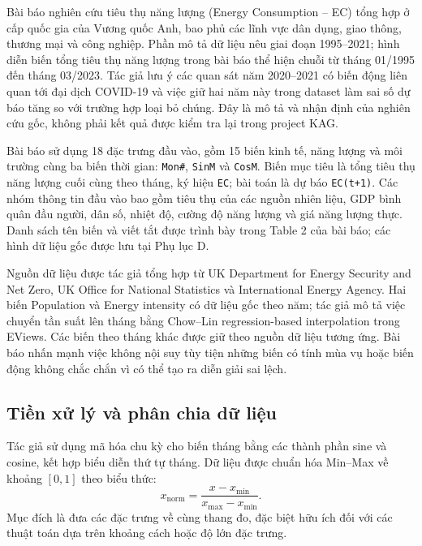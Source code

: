 Bài báo nghiên cứu tiêu thụ năng lượng (Energy Consumption -- EC) tổng hợp ở cấp quốc gia của Vương quốc Anh, bao phủ các lĩnh vực dân dụng, giao thông, thương mại và công nghiệp. Phần mô tả dữ liệu nêu giai đoạn 1995--2021; hình diễn biến tổng tiêu thụ năng lượng trong bài báo thể hiện chuỗi từ tháng 01/1995 đến tháng 03/2023. Tác giả lưu ý các quan sát năm 2020--2021 có biến động liên quan tới đại dịch COVID-19 và việc giữ hai năm này trong dataset làm sai số dự báo tăng so với trường hợp loại bỏ chúng. Đây là mô tả và nhận định của nghiên cứu gốc, không phải kết quả được kiểm tra lại trong project KAG.

Bài báo sử dụng 18 đặc trưng đầu vào, gồm 15 biến kinh tế, năng lượng và môi trường cùng ba biến thời gian: \texttt{Mon\#}, \texttt{SinM} và \texttt{CosM}. Biến mục tiêu là tổng tiêu thụ năng lượng cuối cùng theo tháng, ký hiệu \texttt{EC}; bài toán là dự báo \texttt{EC(t+1)}. Các nhóm thông tin đầu vào bao gồm tiêu thụ của các nguồn nhiên liệu, GDP bình quân đầu người, dân số, nhiệt độ, cường độ năng lượng và giá năng lượng thực. Danh sách tên biến và viết tắt được trình bày trong Table 2 của bài báo; các hình dữ liệu gốc được lưu tại Phụ lục D.

Nguồn dữ liệu được tác giả tổng hợp từ UK Department for Energy Security and Net Zero, UK Office for National Statistics và International Energy Agency. Hai biến Population và Energy intensity có dữ liệu gốc theo năm; tác giả mô tả việc chuyển tần suất lên tháng bằng Chow--Lin regression-based interpolation trong EViews. Các biến theo tháng khác được giữ theo nguồn dữ liệu tương ứng. Bài báo nhấn mạnh việc không nội suy tùy tiện những biến có tính mùa vụ hoặc biến động không chắc chắn vì có thể tạo ra diễn giải sai lệch.

\subsection{Tiền xử lý và phân chia dữ liệu}

Tác giả sử dụng mã hóa chu kỳ cho biến tháng bằng các thành phần sine và cosine, kết hợp biểu diễn thứ tự tháng. Dữ liệu được chuẩn hóa Min--Max về khoảng $[0,1]$ theo biểu thức:
\begin{equation}
 x_{\mathrm{norm}}=\frac{x-x_{\min}}{x_{\max}-x_{\min}}.
 \label{eq:paper-minmax}
\end{equation}
Mục đích là đưa các đặc trưng về cùng thang đo, đặc biệt hữu ích đối với các thuật toán dựa trên khoảng cách hoặc độ lớn đặc trưng.

